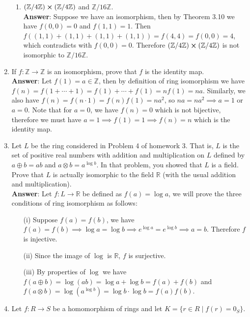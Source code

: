 \documentclass{article}
\begin{document}
\begin{enumerate}
\begin{enumerate}
                  \item $(\mathbb{Z}/4\mathbb{Z})\cross(\mathbb{Z}/4\mathbb{Z})$ and $\mathbb{Z}/16\mathbb{Z}$.\\
                        \textbf{Answer}: Suppose we have an isomorphism, then by Theorem 3.10 we have $f(0,0)=0$ and $f(1,1)=1$. Then $f((1,1)+(1,1)+(1,1)+(1,1))=f(4,4)=f(0,0)=4$, which contradicts with $f(0,0)=0$. Therefore $(\mathbb{Z}/4\mathbb{Z})\cross(\mathbb{Z}/4\mathbb{Z})$ is not isomorphic to $\mathbb{Z}/16\mathbb{Z}$.
            \end{enumerate}
      \item If $f:\mathbb{Z}\rightarrow\mathbb{Z}$ is an isomorphism, prove that $f$ is the identity map.\\
            \textbf{Answer}: Let $f(1)=a\in\mathbb{Z}$, then by definition of ring isomorphism we have $f(n)=f(1+\cdots+1)=f(1)+\cdots+f(1)=nf(1)=na$. Similarly, we also have $f(n)=f(n\cdot 1)=f(n)f(1)=na^2$, so $na=na^2\implies a=1$ or $a=0$. Note that for $a=0$, we have $f(n)=0$ which is not bijective, therefore we must have $a=1\implies f(1)=1\implies f(n)=n$ which is the identity map.
      \item Let $L$ be the ring considered in Problem 4 of homework 3. That is, $L$ is the set of positive real numbers with addition and multiplication on $L$ defined by $a\oplus b=ab$ and $a\otimes b=a^{\log b}$. In that problem, you showed that $L$ is a field. Prove that $L$ is actually isomorphic to the field $\mathbb{R}$ (with the usual addition and multiplication).\\
            \textbf{Answer}: Let $f:L\rightarrow\mathbb{R}$ be defined as $f(a)=\log a$, we will prove the three conditions of ring isomorphism as follows:
            \begin{itemize}
                  \item [(i)] Suppose $f(a)=f(b)$, we have $f(a)=f(b)\implies \log a=\log b\implies e^{\log a}=e^{\log b}\implies a=b$. Therefore $f$ is injective.
                  \item [(ii)] Since the image of $\log$ is $\mathbb{R}$, $f$ is surjective.
                  \item [(iii)] By properties of $\log$ we have $f(a\oplus b)=\log(ab)=\log a+\log b=f(a)+f(b)$ and $f(a\otimes b)=\log(a^{\log b})=\log b\cdot \log b=f(a)f(b)$.
            \end{itemize}
      \item Let $f:R\rightarrow S$ be a homomorphism of rings and let $K=\{r\in R\mid f(r)=0_S\}$.

\end{enumerate}
\end{document}
